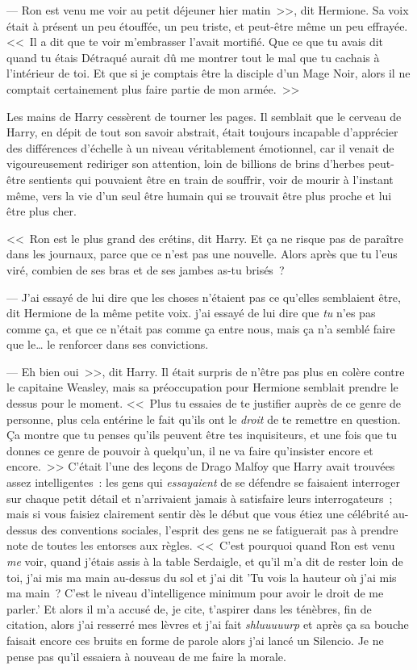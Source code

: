--- Ron est venu me voir au petit déjeuner hier matin~>>, dit Hermione. Sa voix était à présent un peu étouffée, un peu triste, et peut-être même un peu effrayée. <<~Il a dit que te voir m'embrasser l'avait mortifié. Que ce que tu avais dit quand tu étais Détraqué aurait dû me montrer tout le mal que tu cachais à l'intérieur de toi. Et que si je comptais être la disciple d'un Mage Noir, alors il ne comptait certainement plus faire partie de mon armée.~>>

Les mains de Harry cessèrent de tourner les pages. Il semblait que le cerveau de Harry, en dépit de tout son savoir abstrait, était toujours incapable d'apprécier des différences d'échelle à un niveau véritablement émotionnel, car il venait de vigoureusement rediriger son attention, loin de billions de brins d'herbes peut-être sentients qui pouvaient être en train de souffrir, voir de mourir à l'instant même, vers la vie d'un seul être humain qui se trouvait être plus proche et lui être plus cher.

<<~Ron est le plus grand des crétins, dit Harry. Et ça ne risque pas de paraître dans les journaux, parce que ce n'est pas une nouvelle. Alors après que tu l'eus viré, combien de ses bras et de ses jambes as-tu brisés~?

--- J'ai essayé de lui dire que les choses n'étaient pas ce qu'elles semblaient être, dit Hermione de la même petite voix. j'ai essayé de lui dire que \emph{tu} n'es pas comme ça, et que ce n'était pas comme ça entre nous, mais ça n'a semblé faire que le… le renforcer dans ses convictions.

--- Eh bien oui~>>, dit Harry. Il était surpris de n'être pas plus en colère contre le capitaine Weasley, mais sa préoccupation pour Hermione semblait prendre le dessus pour le moment. <<~Plus tu essaies de te justifier auprès de ce genre de personne, plus cela entérine le fait qu'ils ont le \emph{droit} de te remettre en question. Ça montre que tu penses qu'ils peuvent être tes inquisiteurs, et une fois que tu donnes ce genre de pouvoir à quelqu'un, il ne va faire qu'insister encore et encore.~>> C'était l'une des leçons de Drago Malfoy que Harry avait trouvées assez intelligentes~: les gens qui \emph{essayaient} de se défendre se faisaient interroger sur chaque petit détail et n'arrivaient jamais à satisfaire leurs interrogateurs~; mais si vous faisiez clairement sentir dès le début que vous étiez une célébrité au-dessus des conventions sociales, l'esprit des gens ne se fatiguerait pas à prendre note de toutes les entorses aux règles. <<~C'est pourquoi quand Ron est venu \emph{me} voir, quand j'étais assis à la table Serdaigle, et qu'il m'a dit de rester loin de toi, j'ai mis ma main au-dessus du sol et j'ai dit 'Tu vois la hauteur où j'ai mis ma main~? C'est le niveau d'intelligence minimum pour avoir le droit de me parler.' Et alors il m'a accusé de, je cite, t'aspirer dans les ténèbres, fin de citation, alors j'ai resserré mes lèvres et j'ai fait \emph{shluuuuurp} et après ça sa bouche faisait encore ces bruits en forme de parole alors j'ai lancé un Silencio. Je ne pense pas qu'il essaiera à nouveau de me faire la morale.


